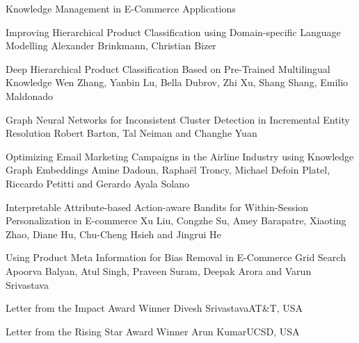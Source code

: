 \documentclass[11pt]{article}
\begin{document}
\begin{bulletin}
\begin{articlesection}{Knowledge Management in E-Commerce Applications}

\begin{article}
{Improving Hierarchical Product Classification using Domain-specific Language Modelling}
{Alexander Brinkmann, Christian Bizer}

\end{article}

\begin{article}
{Deep Hierarchical Product Classification Based on Pre-Trained Multilingual Knowledge}
{Wen Zhang, Yanbin Lu, Bella Dubrov, Zhi Xu, Shang Shang, Emilio Maldonado}

\end{article}

\begin{article}
{Graph Neural Networks for Inconsistent Cluster Detection in Incremental Entity Resolution}
{Robert Barton, Tal Neiman and Changhe Yuan}

\end{article}


\begin{article}
{Optimizing Email Marketing Campaigns in the Airline Industry using Knowledge Graph Embeddings}
{Amine Dadoun, Raphaël Troncy, Michael Defoin Platel, Riccardo Petitti and Gerardo Ayala Solano}

\end{article}

\begin{article}
{Interpretable Attribute-based Action-aware Bandits for Within-Session Personalization in E-commerce}
{Xu Liu, Congzhe Su, Amey Barapatre, Xiaoting Zhao, Diane Hu, Chu-Cheng Hsieh and Jingrui He}

\end{article}

\begin{article}
{Using Product Meta Information for Bias Removal in E-Commerce Grid Search}
{Apoorva Balyan, Atul Singh, Praveen Suram, Deepak Arora and Varun Srivastava}

\end{article}
\end{articlesection}

\begin{awardsection}
\begin{award}{Letter from the Impact Award Winner}
{Divesh Srivastava}{AT\&T, USA}

\end{award}
\newpage
\begin{award}{Letter from the Rising Star Award Winner}
{Arun Kumar}{UCSD, USA}

\end{award}
\end{awardsection}



\end{bulletin}
\end{document}
